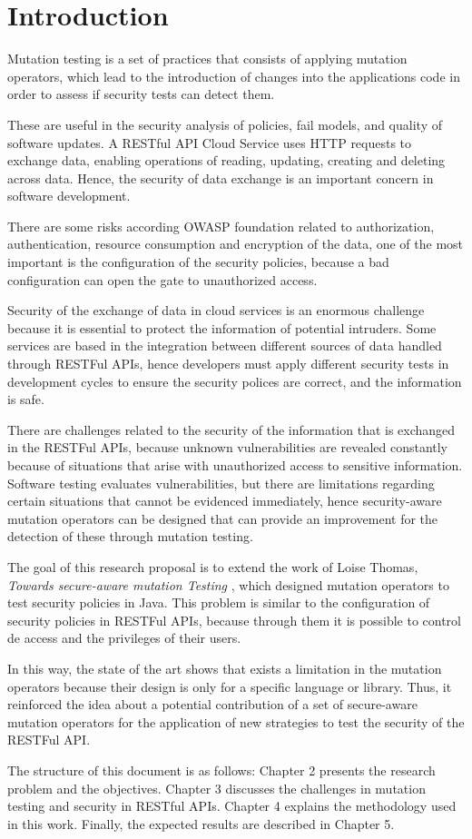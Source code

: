 \chapter*{Introduction}

Mutation testing is a set of practices that consists of applying mutation operators, which lead to the introduction of changes 
into the applications code in order to assess if security tests can detect them.

These are useful in the security analysis of policies\cite{8967426}, fail models\cite{6569774}, and quality of software updates\cite{kravets2012feasibility}. 
A RESTful API Cloud Service uses HTTP requests to exchange data, enabling operations of reading, updating, creating and deleting across data.
Hence, the security of data exchange is an important concern in software development.

There are some risks according OWASP foundation related to authorization, authentication, resource consumption and encryption of the data, 
one of the most important is the configuration of the security policies, because a bad configuration can open the gate to unauthorized access.

Security of the exchange of data in cloud services is an enormous challenge because it is essential to protect the information of potential intruders. 
Some services are based in the integration between different sources of data handled through RESTFul APIs, 
hence developers must apply different security tests in development cycles to ensure the security polices are correct, and the information is safe.

There are challenges related to the security of the information that is exchanged in the RESTFul APIs, 
because unknown vulnerabilities are revealed constantly because of situations that arise with unauthorized access to sensitive information. 
Software testing evaluates vulnerabilities, but there are limitations regarding certain situations that cannot be evidenced immediately, 
hence security-aware mutation operators can be designed that can provide an improvement for the detection of these through mutation testing.

The goal of this research proposal is to extend the work of Loise Thomas, \textit{Towards secure-aware mutation Testing} \cite{Loise2017}, 
which designed mutation operators to test security policies in Java. This problem is similar to the configuration of security policies in RESTFul APIs, 
because through them it is possible to control de access and the privileges of their users.

In this way, the state of the art shows that exists a limitation in the mutation operators because their design is only for a specific language or library. 
Thus, it reinforced the idea about a potential contribution of a set of secure-aware mutation operators for the application of new strategies to test 
the security of the RESTFul API.

The structure of this document is as follows: Chapter 2 presents the research problem and the objectives. 
Chapter 3 discusses the challenges in mutation testing and security in RESTful APIs. 
Chapter 4 explains the methodology used in this work. Finally, the expected results are described in Chapter 5.

